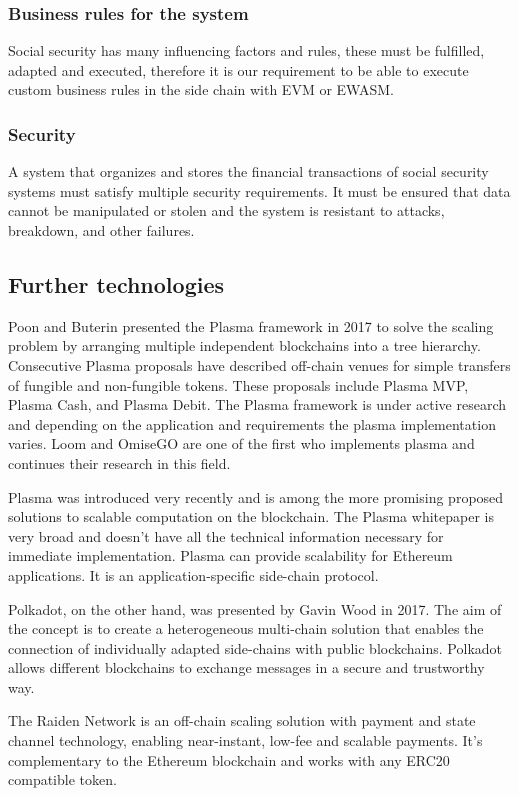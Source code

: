 \subsubsection*{Business rules for the system}
Social security has many influencing factors and rules, these must be fulfilled, adapted and executed, therefore it is our requirement to be able to execute custom business rules in the side chain with EVM or EWASM.

\subsubsection*{Security}
A system that organizes and stores the financial transactions of social security systems must satisfy multiple security requirements. It must be ensured that data cannot be manipulated or stolen and the system is resistant to attacks, breakdown, and other failures.

\subsection{Further technologies}
Poon and Buterin presented the Plasma framework in 2017 to solve the scaling problem by arranging multiple independent blockchains into a tree hierarchy. Consecutive Plasma proposals have described off-chain venues for simple transfers of fungible and non-fungible tokens. These proposals include Plasma MVP, Plasma Cash, and Plasma Debit. The Plasma framework is under active research and depending on the application and requirements the plasma implementation varies.\cite{plasma} Loom and OmiseGO are one of the first who implements plasma and continues their research in this field. 

Plasma was introduced very recently and is among the more promising proposed solutions to scalable computation on the blockchain. The Plasma whitepaper is very broad and doesn’t have all the technical information necessary for immediate implementation. Plasma can provide scalability for Ethereum applications. It is an application-specific side-chain protocol.

Polkadot, on the other hand, was presented by Gavin Wood in 2017. The aim of the concept is to create a heterogeneous multi-chain solution that enables the connection of individually adapted side-chains with public blockchains. Polkadot allows different blockchains to exchange messages in a secure and trustworthy way.

The Raiden Network is an off-chain scaling solution with payment and state channel technology, enabling near-instant, low-fee and scalable payments. It’s complementary to the Ethereum blockchain and works with any ERC20 compatible token.

